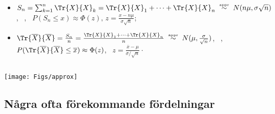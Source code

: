 \documentclass[a4paper]{article}
\newcommand\conj[1]{{\overline #1}}
\let\ob\conj
\begin{document}
\begin{itemize}
  \item $S_n=\sum_{k=1}^n \Tr{X}{X}_k=\Tr{X}{X}_1+\cdots+\Tr{X}{X}_n\;
    \stackrel{\mbox{\tiny appr}}{\sim}\; N(n\mu,\sigma\sqrt{n})$,
        \ , \,
        $P(S_n\le x)\approx
        \Phi(z),\, z=\frac{x-n\mu}{\sigma\sqrt{n}}
        $;

      \item $\Tr{\ob X}{\ob X}=\frac{S_n}n
    =\frac{\Tr{X}{X}_1+\cdots+\Tr{X}{X}_n}n\;
    \stackrel{\mbox{\tiny appr}}{\sim}\; N(\mu,\frac\sigma{\sqrt{n}})$,
        \ , \,
        $P(\Tr{\ob X}{\ob X}\le \ob x)\approx\Phi(z)$, \,
        $z=\frac{\ob x-\mu}{\sigma/\sqrt{n}}\cdot$
\end{itemize}

\subsection*{}%
\medskip
\begin{center}
   \texttt{[image: Figs/approx]}
\end{center}

\subsection*{%
             {Några ofta förekommande fördelningar}}

\def\EspaceAuDessus{&&&&\\*[-10pt]}\def\duPlancher{\\*[2pt] \hline}
\end{document}
